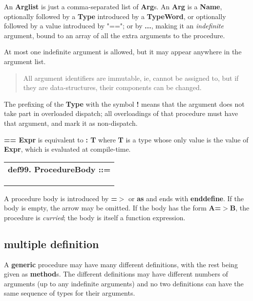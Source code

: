 \documentclass{report}
\begin{document}
An {\bf Arglist} is just a comma-separated list of {\bf Arg}s. An {\bf Arg} is a {\bf Name},
optionally followed by a {\bf Type} introduced by a {\bf TypeWord}, or optionally
followed by a value introduced by "=="; or by {\bf ...}, making it an {\em indefinite}
argument, bound to an array of all the extra arguments to the procedure.

At most one indefinite argument is allowed, but it may appear anywhere in the
argument list.

\begin{quote}All argument identifiers are immutable, ie, cannot be assigned to, but
if they are data-structures, their components can be changed.
\end{quote}The prefixing of the {\bf Type} with the symbol {\bf !} means that the argument
does not take part in overloaded dispatch; all overloadings of that procedure
must have that argument, and mark it as non-dispatch.

{\bf == Expr} is equivalent to {\bf : T} where {\bf T} is a type whose only value is the
value of {\bf Expr}, which is evaluated at compile-time.

\begin{tabular}{l}
{\bf def99. ProcedureBody ::= }\\ 
\hspace*{3mm}{\tt StatementSeq} \\ 
\hspace*{3mm}{\tt  $\mid$ ArgList "=$>$" ProcedureBody} \\ 
\hspace*{3mm}{\tt  $\mid$ Arg "=$>$" ProcedureBody} \\ 
\end{tabular}

A procedure body is introduced by {\bf =$>$} or {\bf as} and ends with {\bf enddefine}. If
the body is empty, the arrow may be omitted. If the body has the form {\bf A=$>$B},
the procedure is {\em curried}; the body is itself a function expression.

\subsection{multiple definition}


A {\bf generic} procedure may have many different definitions, with the rest being
given as {\bf method}s. The different definitions may have different numbers of
arguments (up to any indefinite arguments) and no two definitions can have the
same sequence of types for their arguments.
\end{document}
